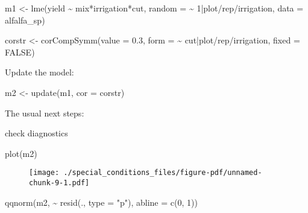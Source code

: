 \documentclass[
  letterpaper,
  DIV=11,
  numbers=noendperiod]{scrreprt}
\newenvironment{Shaded}{\begin{snugshade}}{\end{snugshade}}
\newcommand{\AttributeTok}[1]{\textcolor[rgb]{0.40,0.45,0.13}{#1}}
\newcommand{\ConstantTok}[1]{\textcolor[rgb]{0.56,0.35,0.01}{#1}}
\newcommand{\DecValTok}[1]{\textcolor[rgb]{0.68,0.00,0.00}{#1}}
\newcommand{\FloatTok}[1]{\textcolor[rgb]{0.68,0.00,0.00}{#1}}
\newcommand{\FunctionTok}[1]{\textcolor[rgb]{0.28,0.35,0.67}{#1}}
\newcommand{\NormalTok}[1]{\textcolor[rgb]{0.00,0.23,0.31}{#1}}
\newcommand{\OtherTok}[1]{\textcolor[rgb]{0.00,0.23,0.31}{#1}}
\newcommand{\SpecialCharTok}[1]{\textcolor[rgb]{0.37,0.37,0.37}{#1}}
\newcommand{\StringTok}[1]{\textcolor[rgb]{0.13,0.47,0.30}{#1}}
\begin{document}
\begin{Shaded}
\begin{Highlighting}[numbers=left,,]
\NormalTok{m1 }\OtherTok{\textless{}{-}} \FunctionTok{lme}\NormalTok{(yield }\SpecialCharTok{\textasciitilde{}}\NormalTok{ mix}\SpecialCharTok{*}\NormalTok{irrigation}\SpecialCharTok{*}\NormalTok{cut,}
          \AttributeTok{random =} \SpecialCharTok{\textasciitilde{}} \DecValTok{1}\SpecialCharTok{|}\NormalTok{plot}\SpecialCharTok{/}\NormalTok{rep}\SpecialCharTok{/}\NormalTok{irrigation,}
          \AttributeTok{data =}\NormalTok{ alfalfa\_sp)}

\NormalTok{corstr }\OtherTok{\textless{}{-}} \FunctionTok{corCompSymm}\NormalTok{(}\AttributeTok{value =} \FloatTok{0.3}\NormalTok{, }
                      \AttributeTok{form =} \SpecialCharTok{\textasciitilde{}}\NormalTok{ cut}\SpecialCharTok{|}\NormalTok{plot}\SpecialCharTok{/}\NormalTok{rep}\SpecialCharTok{/}\NormalTok{irrigation,}
                      \AttributeTok{fixed =} \ConstantTok{FALSE}\NormalTok{)}
\end{Highlighting}
\end{Shaded}

Update the model:

\begin{Shaded}
\begin{Highlighting}[]
\NormalTok{m2 }\OtherTok{\textless{}{-}} \FunctionTok{update}\NormalTok{(m1, }\AttributeTok{cor =}\NormalTok{ corstr)}
\end{Highlighting}
\end{Shaded}

The usual next steps:

check diagnostics

\begin{Shaded}
\begin{Highlighting}[]
\FunctionTok{plot}\NormalTok{(m2)}
\end{Highlighting}
\end{Shaded}

\begin{figure}[H]

{\centering \texttt{[image: ./special\_conditions\_files/figure-pdf/unnamed-chunk-9-1.pdf]}

}

\end{figure}

\begin{Shaded}
\begin{Highlighting}[]
\FunctionTok{qqnorm}\NormalTok{(m2, }\SpecialCharTok{\textasciitilde{}} \FunctionTok{resid}\NormalTok{(., }\AttributeTok{type =} \StringTok{"p"}\NormalTok{), }\AttributeTok{abline =} \FunctionTok{c}\NormalTok{(}\DecValTok{0}\NormalTok{, }\DecValTok{1}\NormalTok{))}
\end{Highlighting}
\end{Shaded}
\end{document}
